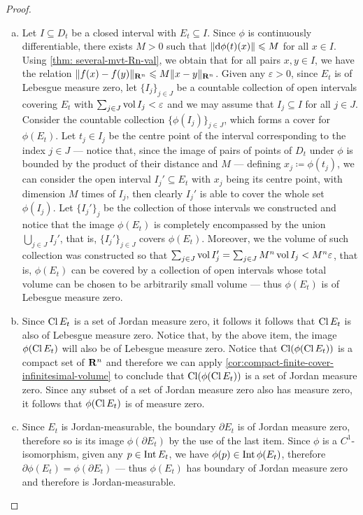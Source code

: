 \begin{proof}
\begin{enumerate}[(a)]\setlength\itemsep{0em}
\item Let \(I \subseteq D_t\) be a closed interval with \(E_t \subseteq
I\). Since \(\phi\) is continuously differentiable, there exists \(M > 0\) such
that \(\lVert\mathrm{d} \phi(t)(x)\rVert \leqslant M\) for all \(x \in I\). Using \cref{thm:
several-mvt-Rn-val}, we obtain that for all pairs \(x, y \in I\), we have the
relation \(\lVert f(x) - f(y)\rVert_{\mathbf{R}^n} \leqslant M \lVert x - y\rVert_{\mathbf{R}^n}\). Given any
\(\varepsilon > 0\), since \(E_t\) is of Lebesgue measure zero, let
\(\{I_{j}\}_{j \in J}\) be a countable collection of open intervals covering
\(E_t\) with \(\sum_{j \in J} \operatorname{vol} I_j < \varepsilon\) and we may assume that
\(I_j \subseteq I\) for all \(j \in J\). Consider the countable collection
\(\{\phi(I_{j})\}_{j \in J}\), which forms a cover for \(\phi(E_t)\). Let \(t_j
\in I_j\) be the centre point of the interval corresponding to the index \(j \in
J\) --- notice that, since the image of pairs of points of \(D_t\) under
\(\phi\) is bounded by the product of their distance and \(M\) --- defining
\(x_j \coloneq \phi(t_j)\), we can consider the open interval \(I_j' \subseteq
E_t\) with \(x_j\) being its centre point, with dimension \(M\) times of
\(I_j\), then clearly \(I_j'\) is able to cover the whole set \(\phi(I_j)\). Let
\(\{I_{j}'\}_j\) be the collection of those intervals we constructed and notice
that the image \(\phi(E_t)\) is completely encompassed by the union \(\bigcup_{j
\in J} I_j'\), that is, \(\{I_{j}'\}_{j \in J}\) covers \(\phi(E_t)\). Moreover,
we the volume of such collection was constructed so that \(\sum_{j \in J} \operatorname{vol}
I_j' = \sum_{j \in J} M^n \operatorname{vol} I_j < M^n \varepsilon\), that is, \(\phi(E_t)\)
can be covered by a collection of open intervals whose total volume can be
chosen to be arbitrarily small volume --- thus \(\phi(E_t)\) is of Lebesgue
measure zero.

\item Since \(\operatorname{Cl} E_t\) is a set of Jordan measure zero, it follows it
  follows that \(\operatorname{Cl} E_t\) is also of Lebesgue measure zero. Notice that,
  by the above item, the image \(\phi(\operatorname{Cl} E_t)\) will also be of Lebesgue
  measure zero. Notice that \(\operatorname{Cl}(\phi(\operatorname{Cl} E_t))\) is a compact set
  of \(\mathbf{R}^n\) and therefore we can apply
  \cref{cor:compact-finite-cover-infinitesimal-volume} to conclude that
  \(\operatorname{Cl}(\phi(\operatorname{Cl} E_t))\) is a set of Jordan measure zero. Since any
  subset of a set of Jordan measure zero also has measure zero, it follows that
  \(\phi(\operatorname{Cl} E_t)\) is of measure zero.

\item Since \(E_t\) is Jordan-measurable, the boundary \(\partial E_t\) is of
  Jordan measure zero, therefore so is its image \(\phi(\partial E_t)\) by the
  use of the last item. Since \(\phi\) is a \(C^1\)-isomorphism, given any \(p \in
  \operatorname{Int} E_t\), we have \(\phi(p) \in \operatorname{Int} \phi(E_t)\), therefore \(\partial
  \phi(E_t) = \phi(\partial E_t)\) --- thus \(\phi(E_t)\) has boundary of Jordan
  measure zero and therefore is Jordan-measurable.
\end{enumerate}
\end{proof}


